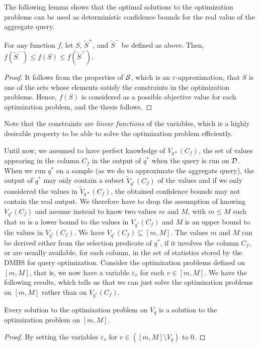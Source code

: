 The following lemma shows that the optimal solutions to the optimization problems
can be used as deterministic confidence bounds for the real value of the
aggregate query.

\begin{lemma}\label{lem:confbounds}
  For any function $f$, let $S$, $\tilde{S}^+$, and $\tilde{S}^-$ be defined as
  above. Then, $f(\tilde{S}^-)\le f(S)\le f(\tilde{S}^+)$.
\end{lemma}
\begin{proof}
  It follows from the properties of ${\cal S}$, which is an
  $\varepsilon$-approximation, that $S$ is one of the sets whose elements
  satisfy the constraints in the optimization problems. Hence, $f(S)$ is
  considered as a possible objective value for  each optimization problem, and
  the thesis follows.
\end{proof}

Note that the constraints are \emph{linear functions} of the variables, which is
a highly desirable property to be able to solve the optimization problem
efficiently. 

Until now, we assumed to have perfect knowledge of $V_{q*}(C_f)$, the set of
values appearing in the column $C_f$ in the output of $q^*$ when the query is
run on ${\cal D}$. When we run $q^*$ on a sample (as we do to approximate the
aggregate query), the output of $q^*$ may only contain a subset
$\tilde{V}_{q^*}(C_f)$ of the values and if we only considered the values in
$\tilde{V}_{q*}(C_f)$, the obtained confidence bounds may not contain the real
output. We therefore have to drop the assumption of knowing $V_{q^*}(C_f)$ and
assume instead to know two values $m$ and $M$, with $m\le M$ such that $m$ is a
lower bound to the values in $V_{q^*}(C_f)$ and $M$ is an upper bound to the
values in $V_{q^*}(C_f)$. We have $V_{q^*}(C_f)\subseteq[m,M]$. The values $m$
and $M$ can be derived either from the selection predicate of $q^*$, if it
involves the column $C_f$, or are usually available, for each column, in the set
of statistics stored by the DMBS for query optimization. Consider the optimization
problems defined on $[m,M]$, that is, we now have a variable $\varepsilon_v$ for
each $v\in[m,M]$. 
We have the following results, which tells us that we can just solve
the optimization problems on $[m,M]$ rather than on $V_{q^*}(C_f)$. 

\begin{lemma}\label{lem:equivoptprobs}
  Every solution to the optimization problem on $V_q$ is a solution to the
  optimization problem on $[m,M]$.
\end{lemma}
\begin{proof}
  By setting the variables $\varepsilon_{v}$ for $v\in([m,M]\setminus V_q)$ to $0$.
\end{proof}

